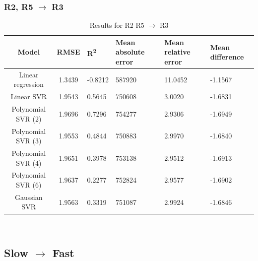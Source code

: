 \documentclass[a4paper,11pt]{article}
\begin{document}
\subsubsection{R2, R5 $\rightarrow$ R3}
\begin{table}[H]
	\centering
	\begin{adjustbox}{center}
		\begin{tabular}{c | c M{1.2cm} M{2.5cm} M{2.5cm} M{1.8cm}}
			Model & RMSE & R\textsuperscript{2} & Mean absolute error & Mean relative error & Mean difference \tabularnewline
			\hline
			Linear regression & 1.3439 & -0.8212 & 587920 & 11.0452 & -1.1567 \\
			Linear SVR & 1.9543 & 0.5645 & 750608 & 3.0020 & -1.6831 \\
			Polynomial SVR (2) & 1.9696 & 0.7296 & 754277 & 2.9306 & -1.6949 \\
			Polynomial SVR (3) & 1.9553 & 0.4844 & 750883 & 2.9970 & -1.6840 \\
			Polynomial SVR (4) & 1.9651 & 0.3978 & 753138 & 2.9512 & -1.6913 \\
			Polynomial SVR (6) & 1.9637 & 0.2277 & 752824 & 2.9577 & -1.6902 \\
			Gaussian SVR & 1.9563 & 0.3319 & 751087 & 2.9924 & -1.6846 \\
		\end{tabular}
	\end{adjustbox}
	\\
	\caption{Results for R2 R5 $\rightarrow$ R3 }
	\label{tab:query_comp_006}
\end{table}

\subsection{Slow $\rightarrow$ Fast}
\end{document}
